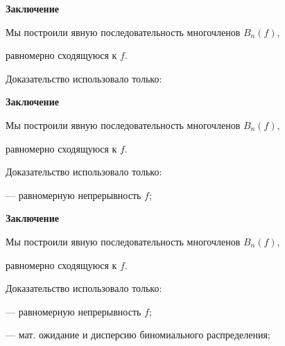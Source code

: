 \documentclass[11pt]{article}
\begin{document}
\newpage

\begin{center}
{\color{notaeYELLOW}\bfseries\fontsize{44}{52}\selectfont Заключение}
\end{center}
\vspace*{\fill}
\begin{center}
\fontsize{36}{43}\selectfont
Мы построили явную последовательность многочленов $B_n(f)$,\par\vspace{0.4in}
равномерно сходящуюся к $f$.\par\vspace{0.4in}
Доказательство использовало только:\par\vspace{0.4in}
\end{center}
\vspace*{\fill}

\newpage

\begin{center}
{\color{notaeYELLOW}\bfseries\fontsize{44}{52}\selectfont Заключение}
\end{center}
\vspace*{\fill}
\begin{center}
\fontsize{36}{43}\selectfont
Мы построили явную последовательность многочленов $B_n(f)$,\par\vspace{0.4in}
равномерно сходящуюся к $f$.\par\vspace{0.4in}
Доказательство использовало только:\par\vspace{0.4in}
— равномерную непрерывность $f$;\par\vspace{0.4in}
\end{center}
\vspace*{\fill}

\newpage

\begin{center}
{\color{notaeYELLOW}\bfseries\fontsize{44}{52}\selectfont Заключение}
\end{center}
\vspace*{\fill}
\begin{center}
\fontsize{36}{43}\selectfont
Мы построили явную последовательность многочленов $B_n(f)$,\par\vspace{0.4in}
равномерно сходящуюся к $f$.\par\vspace{0.4in}
Доказательство использовало только:\par\vspace{0.4in}
— равномерную непрерывность $f$;\par\vspace{0.4in}
— мат. ожидание и дисперсию биномиального распределения;\par\vspace{0.4in}
\end{center}
\vspace*{\fill}
\end{document}
